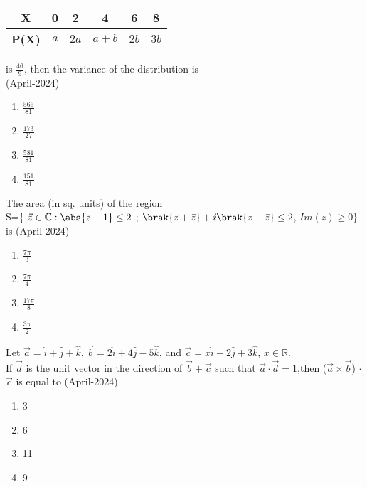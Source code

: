 \begin{table}[h!]    
  \centering
\begin{tabular}[12pt]{ |c| c| c| c| c| c|}
    \hline
    \textbf{X} & 0 & 2 & 4 & 6 & 8 \\ 
    \hline
    \textbf{P(X)} & $a$ & $2a$ & $a+b$ & $2b$ & $3b$ \\
    \hline   
    \end{tabular}
\end{table}
is $\frac{46}{9}$, then the variance of the distribution is \\
\hfill{(April-2024)}
\begin{multicols}{2}
\begin{enumerate}
\item $\frac{566}{81}$
\item  $\frac{173}{27}$
\item $\frac{581}{81}$
\item $\frac{151}{81}$
\end{enumerate}
\end{multicols}
\item The area (in sq. units) of the region \\
S=\{ $\vec{z} \in \mathbb{C}:\abs{z - 1} \leq 2$ ; $\brak{z + \bar{z}} + i\brak{z - \bar{z}} \leq 2$, $Im(z) \geq 0 \}$ is
\hfill{(April-2024)}
\begin{multicols}{2}
\begin{enumerate}
\item $\frac{7\pi}{3}$
\item $\frac{7\pi}{4}$
\item $\frac{17\pi}{8}$
\item $\frac{3\pi}{2}$
\end{enumerate}
\end{multicols}
\item Let $\vec{a} = \hat{i} + \hat{j} + \hat{k}$, $\vec{b} = 2\hat{i} + 4\hat{j} - 5\hat{k}$, and $\vec{c} = x\hat{i} + 2\hat{j} + 3\hat{k}$, $x \in \mathbb{R}$. \\
If $\vec{d}$  is the unit vector in the direction of  $\vec{b} + \vec{c}$ such that $ \vec{a} \cdot \vec{d} = 1$,then ($\vec{a} \times \vec{b}$) $\cdot$ $\vec{c}$ is equal to 
\hfill{(April-2024)}
\begin{multicols}{2}
\begin{enumerate}
\item 3
\item 6
\item 11
\item 9
\end{enumerate}
\end{multicols}


